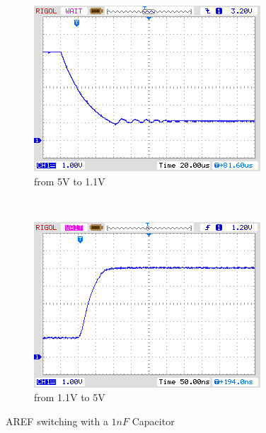 \begin{figure}[H]
  \begin{subfigure}[b]{.5\textwidth}
    \centering
    \includegraphics[width=.95\textwidth]{../PNG/AREF2_1V.png}
    \caption{from 5V to 1.1V }
    \label{pic:aref1}
  \end{subfigure}
  ~
  \begin{subfigure}[b]{.5\textwidth}
    \centering
    \includegraphics[width=.95\textwidth]{../PNG/AREF2VCC.png}
    \caption{from 1.1V to 5V}
    \label{pic:aref5}
  \end{subfigure}
  \caption{AREF switching with a \(1nF\) Capacitor}
\end{figure}

